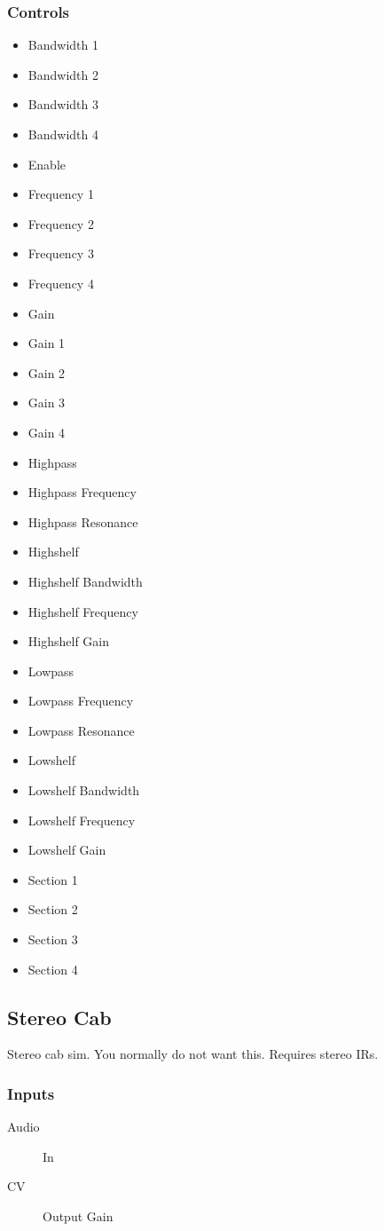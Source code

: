 \subsubsection{Controls}
\begin{itemize}
\item Bandwidth 1
\item Bandwidth 2
\item Bandwidth 3
\item Bandwidth 4
\item Enable
\item Frequency 1
\item Frequency 2
\item Frequency 3
\item Frequency 4
\item Gain
\item Gain 1
\item Gain 2
\item Gain 3
\item Gain 4
\item Highpass
\item Highpass Frequency
\item Highpass Resonance
\item Highshelf
\item Highshelf Bandwidth
\item Highshelf Frequency
\item Highshelf Gain
\item Lowpass
\item Lowpass Frequency
\item Lowpass Resonance
\item Lowshelf
\item Lowshelf Bandwidth
\item Lowshelf Frequency
\item Lowshelf Gain
\item Section 1
\item Section 2
\item Section 3
\item Section 4
\end{itemize}

\subsection{Stereo Cab}

Stereo cab sim. You normally do not want this. Requires stereo IRs.



\subsubsection{Inputs}
\begin{description}
\item [Audio] In
\item [CV] Output Gain
\end{description}

